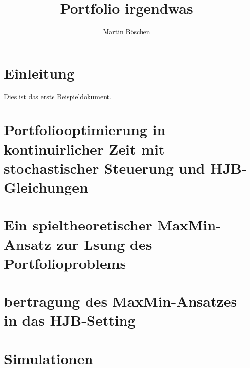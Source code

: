 \documentclass[pdftex,a4paper]{scrartcl}
\title{Portfolio irgendwas}
\author{Martin Böschen}
\begin{document}
\maketitle

\tableofcontents

\section{Einleitung}

Dies ist das erste Beispieldokument.
\section{Portfoliooptimierung in kontinuirlicher Zeit mit stochastischer Steuerung und HJB-Gleichungen}

\section{Ein spieltheoretischer MaxMin-Ansatz zur Lsung des Portfolioproblems}

\section{bertragung des MaxMin-Ansatzes in das HJB-Setting}

\section{Simulationen}
\end{document}
